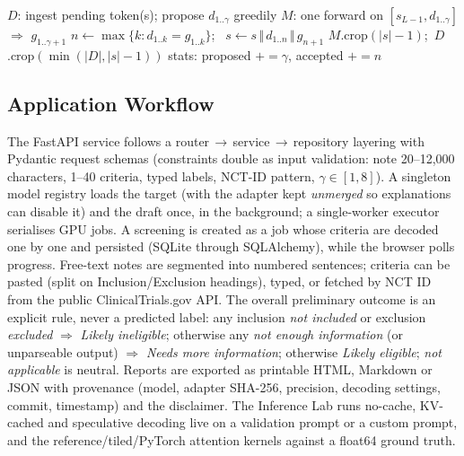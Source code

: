 \begin{algorithm}[t]
\caption{Greedy speculative decoding: one round}\label{alg:spec}
\begin{algorithmic}[1]
\State $D$: ingest pending token(s); propose $d_{1..\gamma}$ greedily
\State $M$: one forward on $[s_{L-1}, d_{1..\gamma}]$ $\Rightarrow$ $g_{1..\gamma+1}$
\State $n\gets\max\{k: d_{1..k}=g_{1..k}\}$; \ $s\gets s\,\Vert\, d_{1..n}\,\Vert\, g_{n+1}$
\State $M$.crop$(|s|-1)$;\ $D$.crop$(\min(|D|,|s|-1))$ 
\State stats: proposed $+{=}\gamma$, accepted $+{=}n$
\end{algorithmic}
\end{algorithm}

\subsection{Application Workflow}\label{sec:app}
The FastAPI service follows a router\,$\rightarrow$\,service\,$\rightarrow$\,repository layering with Pydantic
request schemas (constraints double as input validation: note 20--12{,}000 characters, 1--40 criteria, typed
labels, NCT-ID pattern, $\gamma\in[1,8]$). A singleton model registry loads the target (with the adapter kept
\emph{unmerged} so explanations can disable it) and the draft once, in the background; a single-worker
executor serialises GPU jobs. A screening is created as a job whose criteria are decoded one by one and
persisted (SQLite through SQLAlchemy), while the browser polls progress. Free-text notes are segmented into
numbered sentences; criteria can be pasted (split on Inclusion/Exclusion headings), typed, or fetched by NCT ID
from the public ClinicalTrials.gov API. The overall preliminary outcome is an explicit rule, never a predicted
label: any inclusion \emph{not included} or exclusion \emph{excluded} $\Rightarrow$ \emph{Likely ineligible};
otherwise any \emph{not enough information} (or unparseable output) $\Rightarrow$ \emph{Needs more
information}; otherwise \emph{Likely eligible}; \emph{not applicable} is neutral. Reports are exported as
printable HTML, Markdown or JSON with provenance (model, adapter SHA-256, precision, decoding settings, commit,
timestamp) and the disclaimer. The Inference Lab runs no-cache, KV-cached and speculative decoding live on a
validation prompt or a custom prompt, and the reference/tiled/PyTorch attention kernels against a float64
ground truth.
